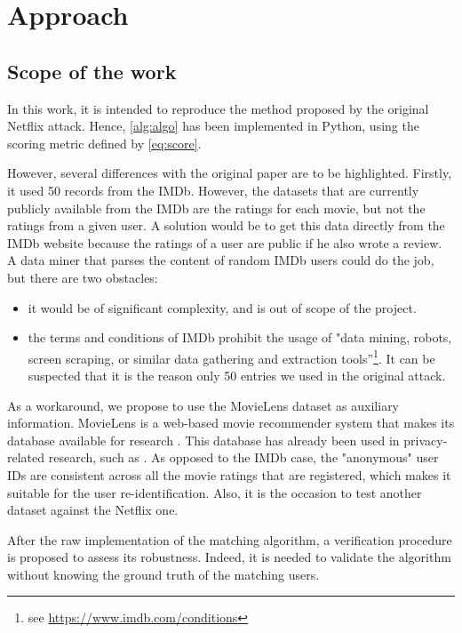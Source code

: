 \section{Approach}\label{sec:approach}

\subsection{Scope of the work}

In this work, it is intended to reproduce the method proposed by the original Netflix attack. Hence, \autoref{alg:algo} has been implemented in Python, using the scoring metric defined by \autoref{eq:score}.

However, several differences with the original paper are to be highlighted. Firstly, it used 50 records from the IMDb. However, the datasets that are currently publicly available from the IMDb are the ratings for each movie, but not the ratings from a given user. A solution would be to get this data directly from the IMDb website because the ratings of a user are public if he also wrote a review. A data miner that parses the content of random IMDb users could do the job, but there are two obstacles:

\begin{itemize}
	\item it would be of significant complexity, and is out of scope of the project.
	\item the terms and conditions of IMDb prohibit the usage of "data mining, robots, screen scraping, or similar data gathering and extraction tools”\footnote{see \url{https://www.imdb.com/conditions}}. It can be suspected that it is the reason only 50 entries we used in the original attack. 
\end{itemize}

As a workaround, we propose to use the MovieLens dataset as auxiliary information. MovieLens is a web-based movie recommender system that makes its database available for research \cite{movielens-db}. This database has already been used in privacy-related research, such as \cite{movielens}. As opposed to the IMDb case, the "anonymous" user IDs are consistent across all the movie ratings that are registered, which makes it suitable for the user re-identification. Also, it is the occasion to test another dataset against the Netflix one.

After the raw implementation of the matching algorithm, a verification procedure is proposed to assess its robustness. Indeed, it is needed to validate the algorithm without knowing the ground truth of the matching users.  

